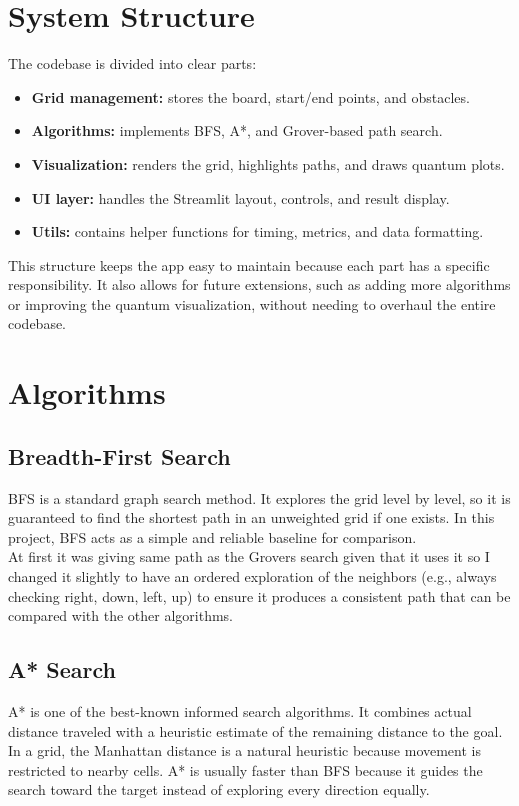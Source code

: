\documentclass[12pt,a4paper]{article}
\begin{document}
\section{System Structure}
The codebase is divided into clear parts:
\begin{itemize}
    \item \textbf{Grid management:} stores the board, start/end points, and obstacles.
    \item \textbf{Algorithms:} implements BFS, A*, and Grover-based path search.
    \item \textbf{Visualization:} renders the grid, highlights paths, and draws quantum plots.
    \item \textbf{UI layer:} handles the Streamlit layout, controls, and result display.
    \item \textbf{Utils:} contains helper functions for timing, metrics, and data formatting.
\end{itemize}

This structure keeps the app easy to maintain because each part has a specific responsibility.
It also allows for future extensions, such as adding more algorithms or improving the quantum visualization, without needing to overhaul the entire codebase.

\section{Algorithms}
\subsection{Breadth-First Search}
BFS is a standard graph search method. 
It explores the grid level by level, so it is guaranteed to find the shortest path in an unweighted grid if one exists. 
In this project, BFS acts as a simple and reliable baseline for comparison. \\

\noindent At first it was giving same path as the Grovers search given that it uses it so I changed it slightly to have an ordered exploration of the neighbors (e.g., always checking right, down, left, up) to ensure it produces a consistent path that can be compared with the other algorithms.

\subsection{A* Search}
A* is one of the best-known informed search algorithms. 
It combines actual distance traveled with a heuristic estimate of the remaining distance to the goal. 
In a grid, the Manhattan distance is a natural heuristic because movement is restricted to nearby cells.
A* is usually faster than BFS because it guides the search toward the target instead of exploring every direction equally. \\
\end{document}
